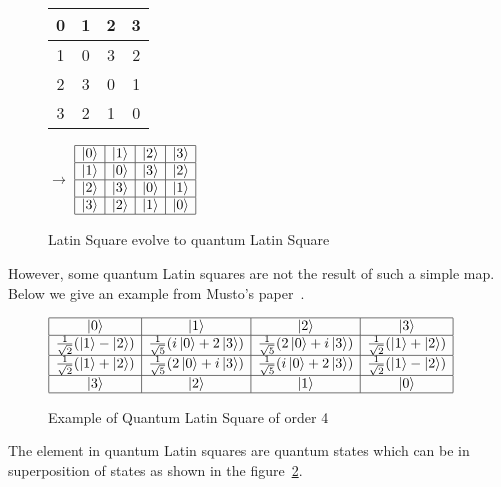 \begin{figure}[H]
  \centering
  \begin{tabular}{|c|c|c|c|}
    \hline
    0 & 1 & 2 & 3 \\
    \hline
    1 & 0 & 3 & 2 \\
    \hline
    2 & 3 & 0 & 1 \\
    \hline
    3 & 2 & 1 & 0 \\
    \hline
  \end{tabular} $\rightarrow$
  $\begin{array}{|c|c|c|c|}
    \hline
    \ket{0} & \ket{1} & \ket{2} & \ket{3} \\
    \hline
    \ket{1} & \ket{0} & \ket{3} & \ket{2} \\
    \hline
    \ket{2} & \ket{3} & \ket{0} & \ket{1} \\
    \hline
    \ket{3} & \ket{2} & \ket{1} & \ket{0} \\
    \hline
  \end{array}$
  \caption{Latin Square evolve to quantum Latin Square}
  \label{fig:Quantum_latin_square}
\end{figure}   

However, some quantum Latin squares are not the result of such a simple map.
Below we give an example from Musto's paper~\cite{vicary2016QuantumLatinSquares}.



\begin{figure}[H]
  \centering
  $\begin{array}{|c|c|c|c|}
    \hline
    \ket{0} & \ket{1} & \ket{2} & \ket{3} \\
    \hline
    \frac{1}{\sqrt{2}}(\ket{1}-\ket{2}) & \frac{1}{\sqrt{5}}(i\ket{0}+2\ket{3}) & \frac{1}{\sqrt{5}}(2\ket{0}+i\ket{3}) & \frac{1}{\sqrt{2}}(\ket{1}+\ket{2}) \\
    \hline
    \frac{1}{\sqrt{2}}(\ket{1}+\ket{2}) & \frac{1}{\sqrt{5}}(2\ket{0}+i\ket{3}) & \frac{1}{\sqrt{5}}(i\ket{0}+2\ket{3}) & \frac{1}{\sqrt{2}}(\ket{1}-\ket{2}) \\
    \hline
    \ket{3} & \ket{2} & \ket{1} & \ket{0} \\
    \hline
    \end{array}$
  \caption{Example of Quantum Latin Square of order 4}
  \label{fig:Quantum_latin_square_order_4}
\end{figure}


The element in quantum Latin squares are quantum states which can be in superposition of states as shown in the figure~\ref{fig:Quantum_latin_square_order_4}.

